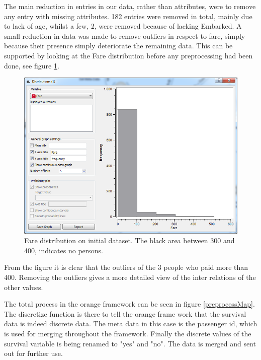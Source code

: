 \documentclass[a4paper,11pt]{article}
\begin{document}
The main reduction in entries in our data, rather than attributes, were to remove any entry with missing attributes. 182 entries were removed in total, mainly due to lack of age, whilst a few, 2, were removed because of lacking Embarked. 
A small reduction in data was made to remove outliers in respect to fare, simply because their presence simply deteriorate the remaining data. This can be supported by looking at the Fare distribution before any preprocessing had been done, see figure \ref{farepreprocess}.

\begin{figure}[h]
\begin{center}
	\includegraphics[scale=0.6]{FarePreprocess}
\end{center}
\caption{Fare distribution on initial dataset. The black area between 300 and 400, indicates no persons.}
\label{farepreprocess}
\end{figure}

From the figure it is clear that the outliers of the 3 people who paid more than 400. Removing the outliers gives a more detailed view of the inter relations of the other values.

The total process in the orange framework can be seen in figure \ref{preprocessMap}. The discretize function is there to tell the orange frame work that the survival data is indeed discrete data. The meta data in this case is the passenger id, which is used for merging throughout the framework. Finally the discrete values of the survival variable is being renamed to "yes" and "no". The data is merged and sent out for further use.
\end{document}
